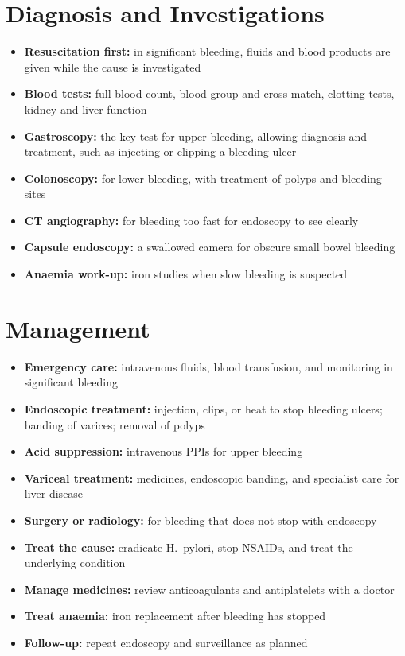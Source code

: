 \section*{Diagnosis and Investigations}
\begin{itemize}
    \item \textbf{Resuscitation first:} in significant bleeding, fluids and blood products are given while the cause is investigated
    \item \textbf{Blood tests:} full blood count, blood group and cross-match, clotting tests, kidney and liver function
    \item \textbf{Gastroscopy:} the key test for upper bleeding, allowing diagnosis and treatment, such as injecting or clipping a bleeding ulcer
    \item \textbf{Colonoscopy:} for lower bleeding, with treatment of polyps and bleeding sites
    \item \textbf{CT angiography:} for bleeding too fast for endoscopy to see clearly
    \item \textbf{Capsule endoscopy:} a swallowed camera for obscure small bowel bleeding
    \item \textbf{Anaemia work-up:} iron studies when slow bleeding is suspected
\end{itemize}

\section*{Management}
\begin{itemize}
    \item \textbf{Emergency care:} intravenous fluids, blood transfusion, and monitoring in significant bleeding
    \item \textbf{Endoscopic treatment:} injection, clips, or heat to stop bleeding ulcers; banding of varices; removal of polyps
    \item \textbf{Acid suppression:} intravenous PPIs for upper bleeding
    \item \textbf{Variceal treatment:} medicines, endoscopic banding, and specialist care for liver disease
    \item \textbf{Surgery or radiology:} for bleeding that does not stop with endoscopy
    \item \textbf{Treat the cause:} eradicate H.\ pylori, stop NSAIDs, and treat the underlying condition
    \item \textbf{Manage medicines:} review anticoagulants and antiplatelets with a doctor
    \item \textbf{Treat anaemia:} iron replacement after bleeding has stopped
    \item \textbf{Follow-up:} repeat endoscopy and surveillance as planned
\end{itemize}

